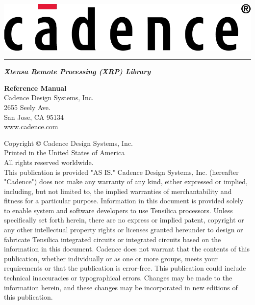 \documentclass[twoside]{book}
\newcommand{\+}{\discretionary{\mbox{\scriptsize$\hookleftarrow$}}{}{}}
\begin{document}
\hypersetup{pageanchor=false,
             bookmarks=true,
             bookmarksnumbered=true,
             pdfencoding=unicode
            }
\begin{titlepage}
\vspace*{1.0in}
\includegraphics[scale=0.9]{Cadence_Logo_Red}
\vspace*{0.2in}
\hrule height0.5pt
\vspace*{0.5cm}
{\Huge\sl\bfseries Xtensa\raisebox{0.8ex}{\normalsize\textregistered} Remote Processing (XRP) Library}\\
\begin{flushright}
\vspace*{0.5cm}
{\Large\bfseries Reference Manual}\\
\vspace*{8.5cm}
Cadence Design Systems, Inc.\\
2655 Seely Ave.\\
San Jose, CA 95134\\
www.cadence.com\\
\end{flushright}
\newpage
\pagestyle{empty}
{\small
Copyright {\copyright} {\the\year} Cadence Design Systems, Inc.\\
Printed in the United States of America\\
All rights reserved worldwide.\\
\vspace*{0.5cm}
\newline This publication is provided "AS IS." Cadence Design Systems, Inc. (hereafter "Cadence") does not make any warranty of any kind, either expressed or implied, including, but not limited to, the implied warranties of merchantability and fitness for a particular purpose. Information in this document is provided solely to enable system and software developers to use Tensilica processors. Unless specifically set forth herein, there are no express or implied patent, copyright or any other intellectual property rights or licenses granted hereunder to design or fabricate Tensilica integrated circuits or integrated circuits based on the information in this document. Cadence does not warrant that the contents of this publication, whether individually or as one or more groups, meets your requirements or that the publication is error-free. This publication could include technical inaccuracies or typographical errors. Changes may be made to the information herein, and these changes may be incorporated in new editions of this publication.
}
\end{titlepage}
\end{document}

